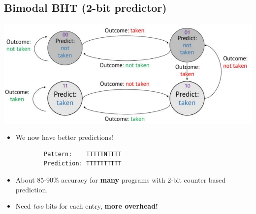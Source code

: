 \documentclass[10pt]{article}
\begin{document}
\subsection*{Bimodal BHT (2-bit predictor)}
\begin{center}
    \includegraphics*[scale=0.8]{W4_8.png}
\end{center}
\begin{itemize}
    \item We now have better predictions!
    \begin{verbatim}
        Pattern:    TTTTTNTTTT
        Prediction: TTTTTTTTTT
    \end{verbatim}
    \item About 85-90\% accuracy for \textbf{many} programs with 2-bit counter based prediction.
    \item Need \textit{two} bits for each entry, \textbf{more overhead!}
\end{itemize}
\end{document}
